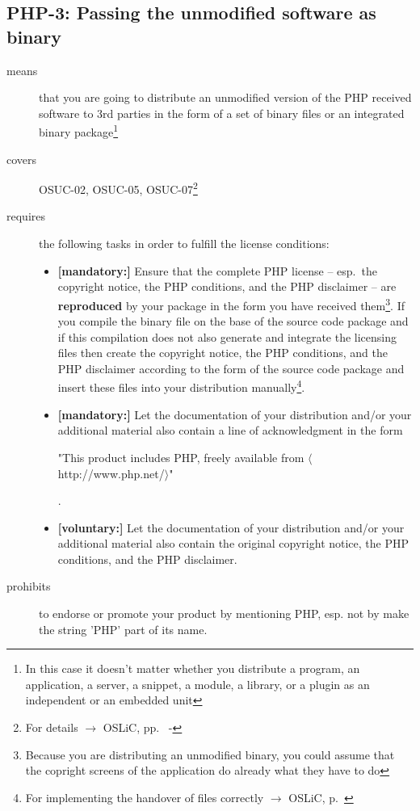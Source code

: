 \subsection{PHP-3: Passing the unmodified software as binary}

\begin{description}

\item[means] that you are going to distribute an unmodified version of the PHP
received software to 3rd parties in the form of a set of binary files or an
integrated bi\-na\-ry package\footnote{In this case it doesn't matter whether
you distribute a program, an application, a server, a snippet, a module, a
library, or a plugin as an independent or an embedded unit}

\item[covers] OSUC-02, OSUC-05, OSUC-07\footnote{For details $\rightarrow$ OSLiC, pp.\
\pageref{OSUC-02-DEF} - \pageref{OSUC-07-DEF}}

\item[requires] the following tasks in order to fulfill the license conditions:
\begin{itemize}

  \item \textbf{[mandatory:]} Ensure that the complete PHP license -- esp.\ the
  copyright notice, the PHP conditions, and the PHP disclaimer -- are
  \textbf{reproduced} by your package in the form you have received
  them\footnote{Because you are distributing an unmodified binary, you could
  assume that the copright screens of the application do already what they have
  to do}. If you compile the binary file on the base of the source code package
  and if this compilation does not also generate and integrate the licensing
  files then create the copyright notice, the PHP conditions, and the PHP
  disclaimer according to the form of the source code package and insert these
  files into your distribution manually\footnote{For implementing the handover
  of files correctly $\rightarrow$ OSLiC, p.\ \pageref{DistributingFilesHint}}.
  
  \item \textbf{[mandatory:]} Let the documentation of your distribution and/or
  your additional material also contain a line of acknowledgment in the form
   \begin{footnotesize}"This product includes PHP, freely available from
  $\langle$http://www.php.net/$\rangle$"\end{footnotesize}.
    
  \item \textbf{[voluntary:]} Let the documentation of your distribution and/or
  your additional material also contain the original copyright notice, the PHP
  conditions, and the PHP disclaimer.

\end{itemize}

\item[prohibits] to endorse or promote your product by mentioning PHP, esp. not
by make the string 'PHP' part of its name.

\end{description}

